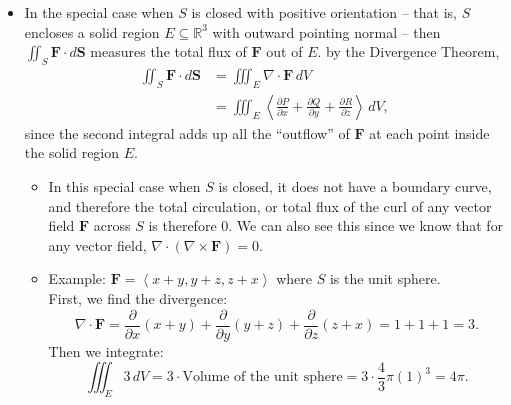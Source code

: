\documentclass[10pt]{article}
\newcommand{\mb}[1]{\mathbf{#1}}
\newcommand{\brackett}[1]{\left\langle #1 \right\rangle}
\newcommand{\R}{\mathbb{R}}
\begin{document}
\begin{itemize}
    \item In the special case when \(S\) is closed with positive orientation – that is, \(S\) encloses a solid region \(E \subseteq \R^{3}\) with outward pointing normal – then \(\displaystyle \iint_{S} \mb{F} \cdot d\mb{S}\) measures the total flux of \(\mb{F}\) out of \(E\). by the Divergence Theorem,
    \begin{align*}
        \iint_{S} \mb{F} \cdot d\mb{S} &= \iiint_{E} \nabla \cdot \mb{F} \, dV \\
        &= \iiint_{E} \left\langle \frac{\partial P}{\partial x} + \frac{\partial Q}{\partial y} + \frac{\partial R}{\partial z} \right\rangle \, dV,
    \end{align*}
    since the second integral adds up all the ``outflow'' of \(\mb{F}\) at each point inside the solid region \(E\).
    \begin{itemize}
        \item In this special case when \(S\) is closed, it does not have a boundary curve, and therefore the total circulation, or total flux of the curl of any vector field \(\mb{F}\) across \(S\) is therefore 0. We can also see this since we know that for any vector field, \(\nabla \cdot (\nabla \times \mb{F}) = 0\).
        \item Example: \(\mb{F} = \brackett{x + y, y + z, z + x}\) where \(S\) is the unit sphere. \\

        First, we find the divergence:
        \[
            \nabla \cdot \mb{F} = \frac{\partial}{\partial x}(x + y) + \frac{\partial}{\partial y}(y + z) + \frac{\partial}{\partial z}(z + x) = 1 + 1 + 1 = 3.
        \]
        Then we integrate:
        \[
            \iiint_{E} 3 \, dV = 3 \cdot \text{Volume of the unit sphere} = 3 \cdot \frac{4}{3} \pi (1)^{3} = 4\pi.
        \]
    \end{itemize}
\end{itemize}
\end{document}

